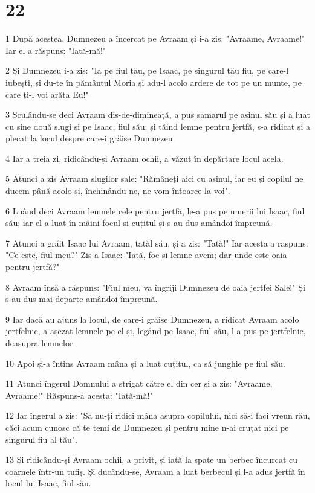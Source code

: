 \chapter{22}

\par 1 După acestea, Dumnezeu a încercat pe Avraam și i-a zis: "Avraame, Avraame!" Iar el a răspuns: "Iată-mă!"
\par 2 Și Dumnezeu i-a zis: "Ia pe fiul tău, pe Isaac, pe singurul tău fiu, pe care-l iubești, și du-te în pământul Moria și adu-l acolo ardere de tot pe un munte, pe care ți-l voi arăta Eu!"
\par 3 Sculându-se deci Avraam dis-de-dimineață, a pus samarul pe asinul său și a luat cu sine două slugi și pe Isaac, fiul său; și tăind lemne pentru jertfă, s-a ridicat și a plecat la locul despre care-i grăise Dumnezeu.
\par 4 Iar a treia zi, ridicându-și Avraam ochii, a văzut în depărtare locul acela.
\par 5 Atunci a zis Avraam slugilor sale: "Rămâneți aici cu asinul, iar eu și copilul ne ducem până acolo și, închinându-ne, ne vom întoarce la voi".
\par 6 Luând deci Avraam lemnele cele pentru jertfă, le-a pus pe umerii lui Isaac, fiul său; iar el a luat în mâini focul și cuțitul și s-au dus amândoi împreună.
\par 7 Atunci a grăit Isaac lui Avraam, tatăl său, și a zis: "Tată!" Iar acesta a răspuns: "Ce este, fiul meu?" Zis-a Isaac: "Iată, foc și lemne avem; dar unde este oaia pentru jertfă?"
\par 8 Avraam însă a răspuns: "Fiul meu, va îngriji Dumnezeu de oaia jertfei Sale!" Și s-au dus mai departe amândoi împreună.
\par 9 Iar dacă au ajuns la locul, de care-i grăise Dumnezeu, a ridicat Avraam acolo jertfelnic, a așezat lemnele pe el și, legând pe Isaac, fiul său, l-a pus pe jertfelnic, deasupra lemnelor.
\par 10 Apoi și-a întins Avraam mâna și a luat cuțitul, ca să junghie pe fiul său.
\par 11 Atunci îngerul Domnului a strigat către el din cer și a zis: "Avraame, Avraame!" Răspuns-a acesta: "Iată-mă!"
\par 12 Iar îngerul a zis: "Să nu-ți ridici mâna asupra copilului, nici să-i faci vreun rău, căci acum cunosc că te temi de Dumnezeu și pentru mine n-ai cruțat nici pe singurul fiu al tău".
\par 13 Și ridicându-și Avraam ochii, a privit, și iată la spate un berbec încurcat cu coarnele într-un tufiș. Și ducându-se, Avraam a luat berbecul și l-a adus jertfă în locul lui Isaac, fiul său.
